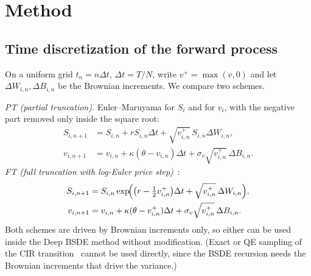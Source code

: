 \section{Method}\label{sec:method}

\subsection{Time discretization of the forward process}\label{sec:schemes}
On a uniform grid $t_n=n\Delta t$, $\Delta t=T/N$, write $v^+=\max(v,0)$ and let $\Delta W_{i,n},\Delta B_{i,n}$ be the Brownian increments. We compare two schemes.

\emph{PT (partial truncation).} Euler--Maruyama for $S_i$ and for $v_i$, with the negative part removed only inside the square root:
\begin{align*}
 S_{i,n+1}&=S_{i,n}+rS_{i,n}\Delta t+\sqrt{v^+_{i,n}}\,S_{i,n}\Delta W_{i,n},\\
 v_{i,n+1}&=v_{i,n}+\kappa(\theta-v_{i,n})\Delta t+\sigma_v\sqrt{v^+_{i,n}}\,\Delta B_{i,n}.
\end{align*}
\emph{FT (full truncation with log-Euler price step)}~\cite{lord2010comparison}:
\begin{align*}
 S_{i,n+1}&=S_{i,n}\exp\!\Bigl(\bigl(r-\tfrac12 v^+_{i,n}\bigr)\Delta t+\sqrt{v^+_{i,n}}\,\Delta W_{i,n}\Bigr),\\
 v_{i,n+1}&=v_{i,n}+\kappa(\theta-v^+_{i,n})\Delta t+\sigma_v\sqrt{v^+_{i,n}}\,\Delta B_{i,n}.
\end{align*}
Both schemes are driven by Brownian increments only, so either can be used inside the Deep BSDE method without modification. (Exact or QE sampling of the CIR transition~\cite{broadie2006exact,andersen2008simple} cannot be used directly, since the BSDE recursion needs the Brownian increments that drive the variance.)

